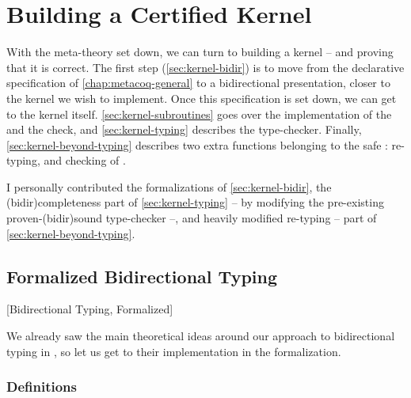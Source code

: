 \chapter{Building a Certified Kernel}
\label{chap:kernel-correctness}

\margintoc

With the meta-theory set down, we can turn to building a kernel – and proving that it is
correct. The first step (\cref{sec:kernel-bidir})
is to move from the declarative specification of
\cref{chap:metacoq-general} to a bidirectional presentation,
closer to the kernel we wish to implement.
Once this specification is set down, we can get to the kernel itself.
\cref{sec:kernel-subroutines} goes over the implementation of the  and the
 check, and \cref{sec:kernel-typing} describes the type-checker.
Finally, \cref{sec:kernel-beyond-typing} describes two extra functions belonging to the safe
: re-typing, and checking of .

I personally contributed the formalizations of \cref{sec:kernel-bidir},
the \kl(bidir){completeness} part of \cref{sec:kernel-typing} –
by modifying the pre-existing proven-\kl(bidir){sound} type-checker –,
and heavily modified re-typing – part of \cref{sec:kernel-beyond-typing}.

\section{Formalized Bidirectional Typing}
  [Bidirectional Typing, Formalized]
\label{sec:kernel-bidir}

We already saw the main theoretical ideas around our approach to bidirectional typing in
, so let us get to their implementation in the formalization.

\subsection{Definitions}

